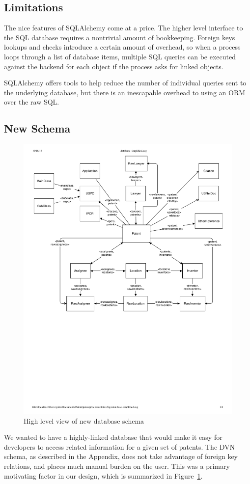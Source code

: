 \subsection{Limitations}

The nice features of SQLAlchemy come at a price. The higher level interface to
the SQL database requires a nontrivial amount of bookkeeping. Foreign keys
lookups and checks introduce a certain amount of overhead, so when a process
loops through a list of database items, multiple SQL queries can be executed
against the backend for each object if the process asks for linked objects.

SQLAlchemy offers tools to help reduce the number of individual queries sent
to the underlying database, but there is an inescapable overhead to using an
ORM over the raw SQL.

\subsection{New Schema}

\begin{figure}
    \center
    \includegraphics[width=.6\textwidth]{figs/database-simplified}
    \caption{High level view of new database schema}
    \label{fig:newschema}
\end{figure}

We wanted to have a highly-linked database that would make it easy for
developers to access related information for a given set of patents. The DVN
schema, as described in the Appendix, does not take advantage of foreign key
relations, and places much manual burden on the user. This was a primary
motivating factor in our design, which is summarized in
Figure~\ref{fig:newschema}.

